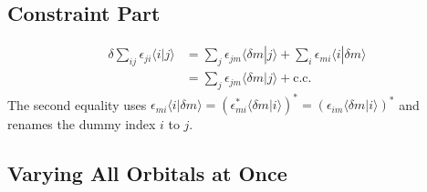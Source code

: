 \subsection{Constraint Part}

\begin{align*}
\delta \sum_{ij} \epsilon_{ji} \langle i|j\rangle &= \sum_j \epsilon_{jm} \langle \delta m|j\rangle + \sum_i \epsilon_{mi} \langle i|\delta m\rangle \\
&= \sum_j \epsilon_{jm} \langle \delta m|j\rangle + \text{c.c.}
\end{align*}
The second equality uses $\epsilon_{mi} \langle i|\delta m\rangle = (\epsilon_{mi}^* \langle\delta m|i\rangle)^* = (\epsilon_{im} \langle\delta m|i\rangle)^*$ and renames the dummy index $i$ to $j$.

\subsection{Varying All Orbitals at Once}

